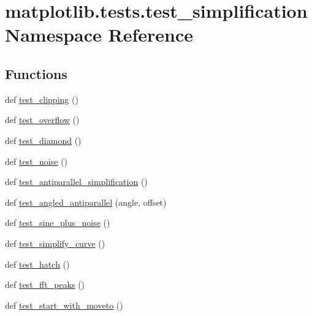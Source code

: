 \hypertarget{namespacematplotlib_1_1tests_1_1test__simplification}{}\section{matplotlib.\+tests.\+test\+\_\+simplification Namespace Reference}
\label{namespacematplotlib_1_1tests_1_1test__simplification}
\subsection*{Functions}
\begin{DoxyCompactItemize}
\item 
def \hyperlink{namespacematplotlib_1_1tests_1_1test__simplification_a326c41894a8e51e3ce592441c54f8a50}{test\+\_\+clipping} ()
\item 
def \hyperlink{namespacematplotlib_1_1tests_1_1test__simplification_ae31c5d0f6c518470619d102ec30ed4f0}{test\+\_\+overflow} ()
\item 
def \hyperlink{namespacematplotlib_1_1tests_1_1test__simplification_a4528e8e5007dcde051132fa878e14ac6}{test\+\_\+diamond} ()
\item 
def \hyperlink{namespacematplotlib_1_1tests_1_1test__simplification_ac2ad51a51e28930034a191462345d9b9}{test\+\_\+noise} ()
\item 
def \hyperlink{namespacematplotlib_1_1tests_1_1test__simplification_a240c65a4f762dbe07ff1d8b29a9c5033}{test\+\_\+antiparallel\+\_\+simplification} ()
\item 
def \hyperlink{namespacematplotlib_1_1tests_1_1test__simplification_a2388bf2aba866574961ffe5d28d19d23}{test\+\_\+angled\+\_\+antiparallel} (angle, offset)
\item 
def \hyperlink{namespacematplotlib_1_1tests_1_1test__simplification_a35f24967fde2d42e4fdeaefbf4e51a1d}{test\+\_\+sine\+\_\+plus\+\_\+noise} ()
\item 
def \hyperlink{namespacematplotlib_1_1tests_1_1test__simplification_afe00d5845c32587cabbc5a15b86b5f92}{test\+\_\+simplify\+\_\+curve} ()
\item 
def \hyperlink{namespacematplotlib_1_1tests_1_1test__simplification_a3b337c62bf23e4b64aef4f6647c645b0}{test\+\_\+hatch} ()
\item 
def \hyperlink{namespacematplotlib_1_1tests_1_1test__simplification_ad8e8aa2ed59d903c995343f93387a582}{test\+\_\+fft\+\_\+peaks} ()
\item 
def \hyperlink{namespacematplotlib_1_1tests_1_1test__simplification_a16915edeb9f49227ad285841d88625ef}{test\+\_\+start\+\_\+with\+\_\+moveto} ()

\end{DoxyCompactItemize}
